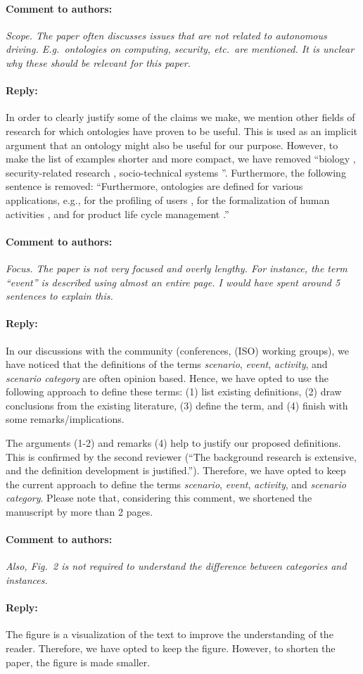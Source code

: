 \documentclass[10pt,final,a4paper,oneside,onecolumn]{article}
\newcommand{\toauthor}{\paragraph*{Comment to authors:} \itshape}
\newcommand{\fromauthor}{\paragraph*{Reply:} \normalfont}
\begin{document}
\toauthor Scope. The paper often discusses issues that are not related to autonomous driving. E.g.\ ontologies on computing, security, etc.\ are mentioned. It is unclear why these should be relevant for this paper.

\fromauthor In order to clearly justify some of the claims we make, we mention other fields of research for which ontologies have proven to be useful. This is used as an implicit argument that an ontology might also be useful for our purpose. However, to make the list of examples shorter and more compact, we have removed ``biology \autocite{gkoutos2004mouse}, security-related research \autocite{kim2005security}, socio-technical systems \autocite{vanDamPhDThesis2009}''. Furthermore, the following sentence is removed: ``Furthermore, ontologies are defined for various applications, e.g., for the profiling of users \autocite{golemati2007creating}, for the formalization of human activities \autocite{lee2017location}, and for product life cycle management \autocite{matsokis2010plm}.''



\toauthor Focus. The paper is not very focused and overly lengthy. For instance, the term ``event'' is described using almost an entire page. I would have spent around 5 sentences to explain this.  

\fromauthor  In our discussions with the community (conferences, (ISO) working groups), we have noticed that the definitions of the terms \emph{scenario}, \emph{event}, \emph{activity}, and \emph{scenario category} are often opinion based. Hence, we have opted to use the following approach to define these terms: (1) list existing definitions, (2) draw conclusions from the existing literature, (3) define the term, and (4) finish with some remarks/implications. 

The arguments (1-2) and remarks (4) help to justify our proposed definitions. This is confirmed by the second reviewer (``The background research is extensive, and the definition development is justified.''). Therefore, we have opted to keep the current approach to define the terms \emph{scenario}, \emph{event}, \emph{activity}, and \emph{scenario category}. Please note that, considering this comment, we shortened the manuscript by more than 2 pages.



\toauthor Also, Fig.~2 is not required to understand the difference between categories and instances. 

\fromauthor The figure is a visualization of the text to improve the understanding of the reader. Therefore, we have opted to keep the figure. However, to shorten the paper, the figure is made smaller.
\end{document}
